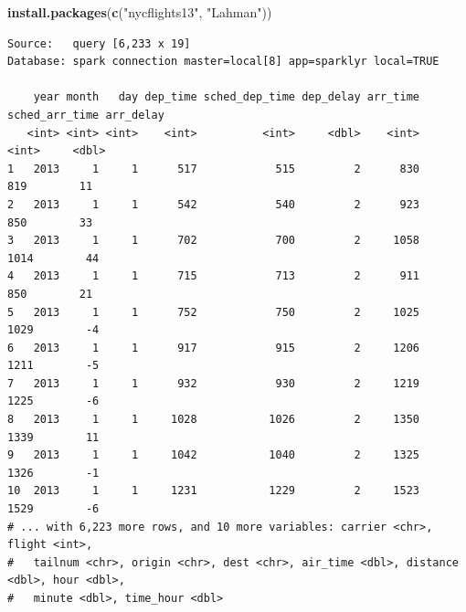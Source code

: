 \documentclass[]{book}
\newenvironment{Shaded}{\begin{snugshade}}{\end{snugshade}}
\newcommand{\KeywordTok}[1]{\textcolor[rgb]{0.13,0.29,0.53}{\textbf{{#1}}}}
\newcommand{\DecValTok}[1]{\textcolor[rgb]{0.00,0.00,0.81}{{#1}}}
\newcommand{\StringTok}[1]{\textcolor[rgb]{0.31,0.60,0.02}{{#1}}}
\newcommand{\NormalTok}[1]{{#1}}
\theoremstyle{definition}
\theoremstyle{definition}
\theoremstyle{remark}
\begin{document}
\begin{Shaded}
\begin{Highlighting}[]
\KeywordTok{install.packages}\NormalTok{(}\KeywordTok{c}\NormalTok{(}\StringTok{"nycflights13"}\NormalTok{, }\StringTok{"Lahman"}\NormalTok{))}
\end{Highlighting}
\end{Shaded}

\begin{Shaded}
\end{Shaded}

\begin{verbatim}
Source:   query [6,233 x 19]
Database: spark connection master=local[8] app=sparklyr local=TRUE

    year month   day dep_time sched_dep_time dep_delay arr_time sched_arr_time arr_delay
   <int> <int> <int>    <int>          <int>     <dbl>    <int>          <int>     <dbl>
1   2013     1     1      517            515         2      830            819        11
2   2013     1     1      542            540         2      923            850        33
3   2013     1     1      702            700         2     1058           1014        44
4   2013     1     1      715            713         2      911            850        21
5   2013     1     1      752            750         2     1025           1029        -4
6   2013     1     1      917            915         2     1206           1211        -5
7   2013     1     1      932            930         2     1219           1225        -6
8   2013     1     1     1028           1026         2     1350           1339        11
9   2013     1     1     1042           1040         2     1325           1326        -1
10  2013     1     1     1231           1229         2     1523           1529        -6
# ... with 6,223 more rows, and 10 more variables: carrier <chr>, flight <int>,
#   tailnum <chr>, origin <chr>, dest <chr>, air_time <dbl>, distance <dbl>, hour <dbl>,
#   minute <dbl>, time_hour <dbl>
\end{verbatim}
\end{document}
